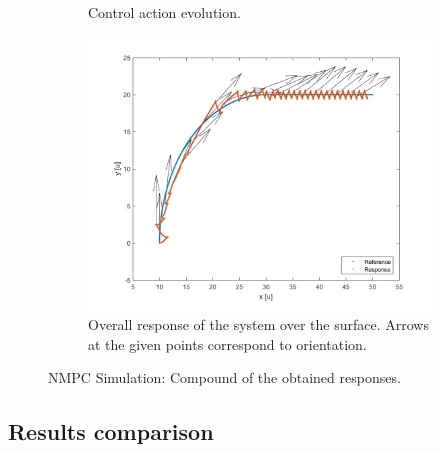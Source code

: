 \documentclass[conference]{IEEEtran}
\begin{document}
\begin{figure}
\begin{subfigure}[t]{0.4\textwidth}
\caption{\label{fig:nmpcu}Control action evolution.}
\end{subfigure}
\begin{subfigure}[t]{0.4\textwidth}
\includegraphics[width=1.4\textwidth]{nmpc_xy.png}
\caption{\label{fig:nmpcxy}Overall response of the system over the surface. Arrows at the given points correspond to orientation.}
\end{subfigure}
\caption{\label{fig:nmpc_simulation}NMPC Simulation: Compound of the obtained responses.}
\end{figure}


\subsection{Results comparison}\label{CD}
\end{document}
